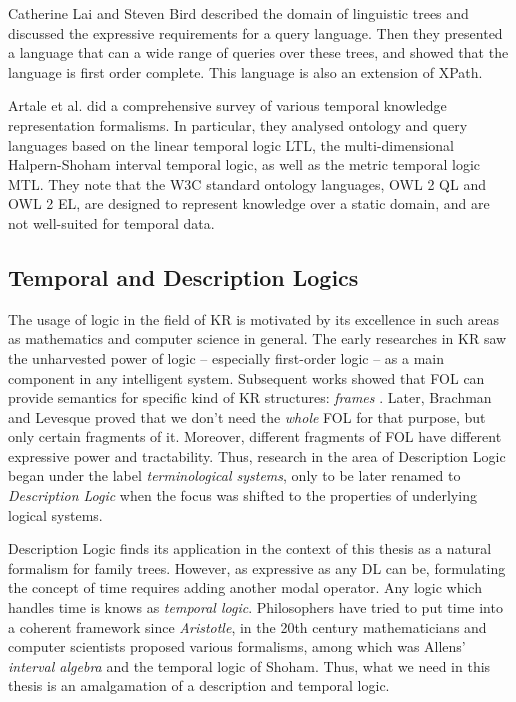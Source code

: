 Catherine Lai and Steven Bird \cite{ling} described the domain of linguistic trees and discussed the expressive requirements for a
query language. Then they presented a language that can a wide range of queries over these trees, and showed that the language is
first order complete. This language is also an extension of XPath.

Artale et al. \cite{artale} did a comprehensive survey of various temporal knowledge representation formalisms.
In particular, they analysed ontology and query languages based on the linear
temporal logic LTL, the multi-dimensional Halpern-Shoham interval temporal logic, as well as the metric temporal logic MTL. They
note that the W3C standard ontology languages, OWL 2 QL and OWL 2 EL, are designed to represent knowledge over a static domain,
and are not well-suited for temporal data.

\subsection{Temporal and Description Logics}
The usage of logic in the field of KR is motivated by its excellence in such areas as mathematics and computer science in general.
The early researches in KR saw the unharvested power of logic -- especially first-order logic -- as a main component in any
intelligent system. Subsequent works showed that FOL can provide semantics for specific kind of KR structures:
\textit{frames} \cite{frames}. Later, Brachman and Levesque proved \cite{krhyp} that we don't need the \textit{whole} FOL for that
purpose, but only certain fragments of it. Moreover, different fragments of FOL have different expressive power and tractability.
Thus, research in the area of Description Logic began under the label \textit{terminological systems}, only to be later renamed to
\textit{Description Logic} when the focus was shifted to the properties of underlying logical systems.

Description Logic finds its application in the context of this thesis as a natural formalism for family trees. However, as
expressive as any DL can be, formulating the concept of time requires adding another modal operator. Any logic which handles time
is knows as \textit{temporal logic}. Philosophers have tried to put time into a coherent framework since \textit{Aristotle}, in
the 20th century mathematicians and computer scientists proposed various formalisms, among which was Allens' \textit{interval
algebra}\cite{allen} and the temporal logic of Shoham\cite{shoh}. Thus, what we need in this thesis is an amalgamation of a
description and temporal logic.

